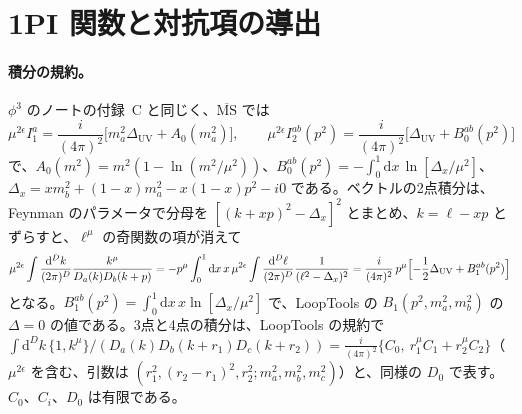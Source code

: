 \documentclass[a4paper,10pt]{ltjsarticle}
\newcommand{\dd}{\mathrm{d}}
\begin{document}
\section{1PI 関数と対抗項の導出}\label{app:ren}

\paragraph{積分の規約。}$\phi^3$ のノートの付録~C と同じく、$\overline{\mathrm{MS}}$ では
\begin{equation*}
\mu^{2\epsilon}I_1^a=\frac{i}{(4\pi)^2}\bigl[m_a^2\Delta_{\mathrm{UV}}+A_0(m_a^2)\bigr],\qquad
\mu^{2\epsilon}I_2^{ab}(p^2)=\frac{i}{(4\pi)^2}\bigl[\Delta_{\mathrm{UV}}+B_0^{ab}(p^2)\bigr]
\end{equation*}
で、$A_0(m^2)=m^2(1-\ln(m^2/\mu^2))$、$B_0^{ab}(p^2)=-\int_0^1\dd x\,\ln[\Delta_x/\mu^2]$、$\Delta_x=xm_b^2+(1-x)m_a^2-x(1-x)p^2-i0$ である。ベクトルの2点積分は、Feynman のパラメータで分母を $[(k+xp)^2-\Delta_x]^2$ とまとめ、$k=\ell-xp$ とずらすと、$\ell^\mu$ の奇関数の項が消えて
\begin{equation*}
\mu^{2\epsilon}\int\frac{\dd^Dk}{(2\pi)^D}\frac{k^\mu}{D_a(k)D_b(k+p)}=-p^\mu\int_0^1\dd x\,x\,\mu^{2\epsilon}\int\frac{\dd^D\ell}{(2\pi)^D}\frac{1}{(\ell^2-\Delta_x)^2}
=\frac{i}{(4\pi)^2}\,p^\mu\Bigl[-\frac12\Delta_{\mathrm{UV}}+B_1^{ab}(p^2)\Bigr]
\end{equation*}
となる。$B_1^{ab}(p^2)=\int_0^1\dd x\,x\ln[\Delta_x/\mu^2]$ で、LoopTools の $B_1(p^2,m_a^2,m_b^2)$ の $\Delta=0$ の値である。3点と4点の積分は、LoopTools の規約で $\int\dd^Dk\,\{1,k^\mu\}/(D_{a}(k)D_{b}(k+r_1)D_{c}(k+r_2))=\frac{i}{(4\pi)^2}\{C_0,\ r_1^\mu C_1+r_2^\mu C_2\}$（$\mu^{2\epsilon}$ を含む、引数は $(r_1^2,(r_2-r_1)^2,r_2^2;m_a^2,m_b^2,m_c^2)$）と、同様の $D_0$ で表す。$C_0$、$C_i$、$D_0$ は有限である。
\end{document}
